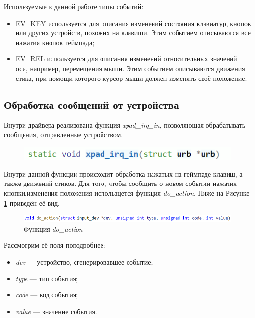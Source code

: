 Используемые в данной работе типы событий:
\begin{itemize}
	\item EV\_KEY используется для описания изменений состояния клавиатур,
	 кнопок или других устройств, похожих на клавиши. Этим событием описываются все нажатия кнопок геймпада;
	\item EV\_REL используется для описания изменений относительных значений оси, например, перемещения мыши.
	Этим событием описываются движения стика, при помощи которого курсор мыши должен изменять своё положение.
\end{itemize}\par


\subsection{Обработка сообщений от устройства}
Внутри драйвера реализована функция \textit{xpad\_irq\_in},
позволяющая обрабатывать сообщения, отправленные устройством.
\begin{figure}[h!]
	\centering
	\includegraphics[scale=1]{img/xpad-irq-in.png}
\end{figure}\par
Внутри данной функции происходит обработка нажатых на геймпаде клавиш, а также движений стиков.
Для того, чтобы сообщить о новом событии нажатия кнопки,изменения положения использцется функция \textit{do\_action}.
Ниже на Рисунке \ref{input_report} приведён её вид.

\begin{figure}[h!]
	\centering
	\includegraphics[scale=0.9]{img/action-naming.png}
	\caption{Функция \textit{do\_action}}
	\label{input_report}
\end{figure}\par
\newpage

Рассмотрим её поля поподробнее:
\begin{itemize}
	\item \textit{dev} --- устройство, сгенерировавшее событие;
	\item \textit{type} --- тип события;
	\item \textit{code} --- код события;
	\item \textit{value} --- значение события.
\end{itemize}\par

